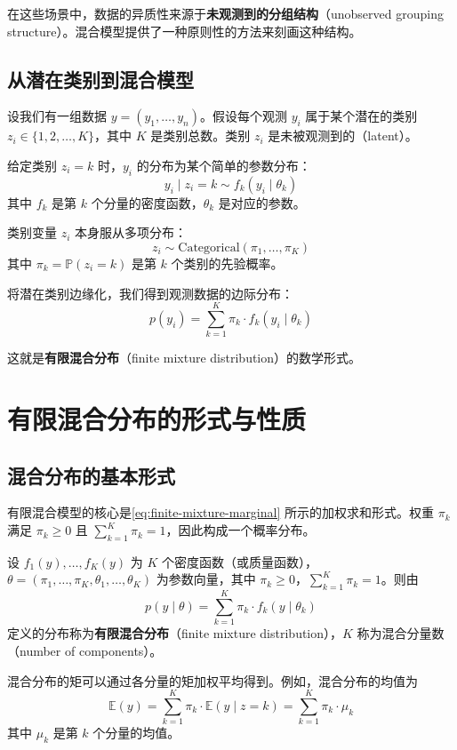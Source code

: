 在这些场景中，数据的异质性来源于\textbf{未观测到的分组结构}（unobserved grouping structure）。混合模型提供了一种原则性的方法来刻画这种结构。

\subsection{从潜在类别到混合模型}

设我们有一组数据 $y = (y_1, \ldots, y_n)$。假设每个观测 $y_i$ 属于某个潜在的类别 $z_i \in \{1, 2, \ldots, K\}$，其中 $K$ 是类别总数。类别 $z_i$ 是未被观测到的（latent）。

给定类别 $z_i = k$ 时，$y_i$ 的分布为某个简单的参数分布：
\[
y_i \mid z_i = k \sim f_k(y_i \mid \theta_k)
\]
其中 $f_k$ 是第 $k$ 个分量的密度函数，$\theta_k$ 是对应的参数。

类别变量 $z_i$ 本身服从多项分布：
\[
z_i \sim \text{Categorical}(\pi_1, \ldots, \pi_K)
\]
其中 $\pi_k = \mathbb{P}(z_i = k)$ 是第 $k$ 个类别的先验概率。

将潜在类别边缘化，我们得到观测数据的边际分布：
\[
p(y_i) = \sum_{k=1}^{K} \pi_k \cdot f_k(y_i \mid \theta_k)
\label{eq:finite-mixture-marginal}
\]

这就是\textbf{有限混合分布}（finite mixture distribution）的数学形式。

\section{有限混合分布的形式与性质}

\subsection{混合分布的基本形式}

有限混合模型的核心是\cref{eq:finite-mixture-marginal} 所示的加权求和形式。权重 $\pi_k$ 满足 $\pi_k \geq 0$ 且 $\sum_{k=1}^{K} \pi_k = 1$，因此构成一个概率分布。

\begin{Definition}[有限混合分布]
  设 $f_1(y), \ldots, f_K(y)$ 为 $K$ 个密度函数（或质量函数），$\theta = (\pi_1, \ldots, \pi_K, \theta_1, \ldots, \theta_K)$ 为参数向量，其中 $\pi_k \geq 0$，$\sum_{k=1}^K \pi_k = 1$。则由
  \[
  p(y \mid \theta) = \sum_{k=1}^{K} \pi_k \cdot f_k(y \mid \theta_k)
  \]
  定义的分布称为\textbf{有限混合分布}（finite mixture distribution），$K$ 称为混合分量数（number of components）。
\end{Definition}

混合分布的矩可以通过各分量的矩加权平均得到。例如，混合分布的均值为
\[
\mathbb{E}(y) = \sum_{k=1}^{K} \pi_k \cdot \mathbb{E}(y \mid z=k) = \sum_{k=1}^{K} \pi_k \cdot \mu_k
\]
其中 $\mu_k$ 是第 $k$ 个分量的均值。


